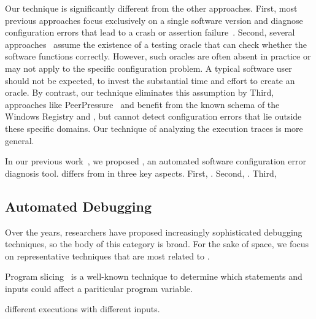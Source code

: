 Our technique is significantly different from the other approaches.
First, most previous approaches focus exclusively on a single software
version and diagnose configuration errors that lead to a crash or
assertion failure~\cite{Attariyan:2008:UCD, Whitaker:2004:CDS, 
Attariyan:2010:ACT, Rabkin:2011:PPC}.
Second, several approaches~\cite{Attariyan:2010:ACT, Whitaker:2004:CDS}
assume the existence of a testing oracle that can 
check whether the software functions correctly. However,
such oracles are often
absent in practice or may not apply to the specific configuration problem.
A typical software user should not be expected, to invest the substantial
time and effort to create an oracle.
By contrast, our technique eliminates this assumption by
Third, approaches like PeerPressure~\cite{Wang:2004:AMT}
and  benefit from
the known schema of the Windows Registry and
, but cannot detect configuration errors
that lie outside these specific domains. Our technique
of analyzing the execution traces is more general.

In our previous work~\cite{}, we proposed \prevtool, an automated
software configuration error diagnosis tool. \ourtool
differs from \prevtool in three key aspects.
First, . Second, .
Third, 



\subsection{Automated Debugging}

Over the years, researchers have proposed
increasingly sophisticated debugging techniques,
so the body of this category is broad.
For the sake of space, we focus on representative techniques
that are most related to \ourtool.

Program slicing~\cite{} is a
well-known technique to determine which statements and
inputs could affect a pariticular program variable.

different executions with different inputs.



